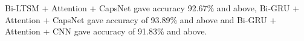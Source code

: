 Bi-LTSM + Attention + CapsNet gave accuracy 92.67\% and above, Bi-GRU + Attention + CapsNet gave accuracy of 93.89\% and above and Bi-GRU + Attention + CNN gave accuracy of 91.83\% and above.